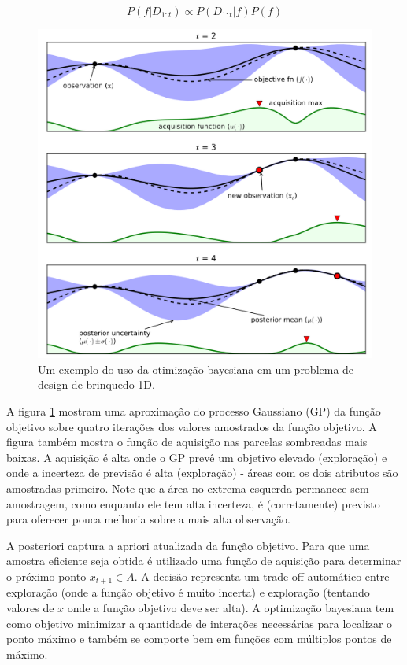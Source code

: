 \documentclass[
	12pt,				%
	a4paper,		%
	oneside,    %
	chapter=TITLE,		   %
	section=TITLE,		   %
	subsection=TITLE,	   %
	subsubsection=TITLE, %
	english,			%
	french,				%
	spanish,			%
	brazil,				%
]{abntex2}
\begin{document}
\[
P(f|D_{1:t}) \propto P(D_{1:t}|f)P(f)
\]

\begin{figure}
\centering
\includegraphics[width=\textwidth,height=0.6\textheight]{fig/bo.png}
\caption{Um exemplo do uso da otimização bayesiana em um problema de
design de brinquedo 1D.\label{bo}}
\end{figure}

A figura \ref{bo} mostram uma aproximação do processo Gaussiano (GP) da
função objetivo sobre quatro iterações dos valores amostrados da função
objetivo. A figura também mostra o função de aquisição nas parcelas
sombreadas mais baixas. A aquisição é alta onde o GP prevê um objetivo
elevado (exploração) e onde a incerteza de previsão é alta (exploração)
- áreas com os dois atributos são amostradas primeiro. Note que a área
no extrema esquerda permanece sem amostragem, como enquanto ele tem alta
incerteza, é (corretamente) previsto para oferecer pouca melhoria sobre
a mais alta observação.

A posteriori captura a apriori atualizada da função objetivo. Para que
uma amostra eficiente seja obtida é utilizado uma função de aquisição
para determinar o próximo ponto \(x_{t+1} \in A\). A decisão representa
um trade-off automático entre exploração (onde a função objetivo é muito
incerta) e exploração (tentando valores de \(x\) onde a função objetivo
deve ser alta). A optimização bayesiana tem como objetivo minimizar a
quantidade de interações necessárias para localizar o ponto máximo e
também se comporte bem em funções com múltiplos pontos de máximo.
\end{document}
